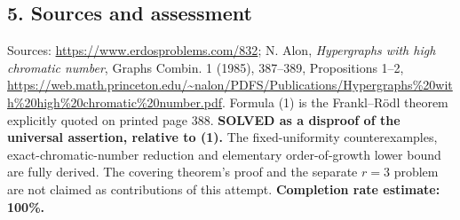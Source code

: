 \subsection*{5. Sources and assessment}
Sources: \url{https://www.erdosproblems.com/832}; N. Alon, \emph{Hypergraphs with high chromatic number}, Graphs Combin. 1 (1985), 387--389, Propositions 1--2, \url{https://web.math.princeton.edu/~nalon/PDFS/Publications/Hypergraphs%20with%20high%20chromatic%20number.pdf}. Formula (1) is the Frankl--R\"odl theorem explicitly quoted on printed page 388.
\textbf{SOLVED as a disproof of the universal assertion, relative to (1).} The fixed-uniformity counterexamples, exact-chromatic-number reduction and elementary order-of-growth lower bound are fully derived. The covering theorem's proof and the separate $r=3$ problem are not claimed as contributions of this attempt.
\textbf{Completion rate estimate: 100\%.}
